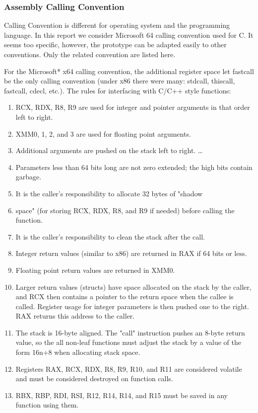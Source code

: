 \documentclass[paper=a4, fontsize=11pt]{scrartcl}
\numberwithin{equation}{section}		%
\numberwithin{figure}{section}			%
\numberwithin{table}{section}				%
\begin{document}
\subsubsection{Assembly Calling Convention}
Calling Convention is different for operating system and the programming language. In this report we consider Microsoft 64 calling convention used for C. It seems too specific, however, the prototype can be adapted easily to other conventions. Only the related convention are listed here.\par
For the Microsoft* x64 calling convention, the additional register space let fastcall be the only calling convention (under x86 there were many: stdcall, thiscall, fastcall, cdecl, etc.). The rules for interfacing with C/C++ style functions:\par
\begin{enumerate}  
\item RCX, RDX, R8, R9 are used for integer and pointer arguments in that order left to right.
\item XMM0, 1, 2, and 3 are used for floating point arguments.
\item Additional arguments are pushed on the stack left to right. \ldots 
\item Parameters less than 64 bits long are not zero extended; the high bits contain garbage.
\item It is the caller's responsibility to allocate 32 bytes of "shadow \item space" (for storing RCX, RDX, R8, and R9 if needed) before calling the function.
\item It is the caller's responsibility to clean the stack after the call.
\item Integer return values (similar to x86) are returned in RAX if 64 bits or less.
\item Floating point return values are returned in XMM0.
\item Larger return values (structs) have space allocated on the stack by the caller, and RCX then contains a pointer to the return space when the callee is called. Register usage for integer parameters is then pushed one to the right. RAX returns this address to the caller.
\item The stack is 16-byte aligned. The "call" instruction pushes an 8-byte return value, so the all non-leaf functions must adjust the stack by a value of the form 16n+8 when allocating stack space.
\item Registers RAX, RCX, RDX, R8, R9, R10, and R11 are considered volatile and must be considered destroyed on function calls.
\item RBX, RBP, RDI, RSI, R12, R14, R14, and R15 must be saved in any function using them.
\end{enumerate}
\end{document}
